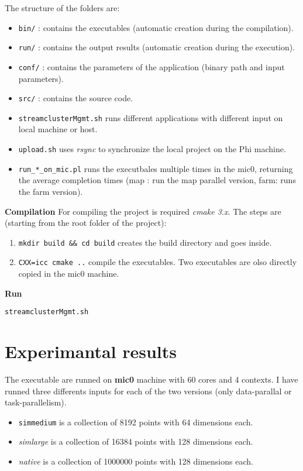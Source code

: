 \documentclass[12pt]{article}
\begin{document}
The structure of the folders are:
\begin{itemize}
\item \texttt{bin/}  : contains the executables (automatic creation during the compilation).
\item \texttt{run/}  : contains the output results (automatic creation during the execution).
\item \texttt{conf/} : contains the parameters of the application (binary path and input parameters).
\item \texttt{src/} : contains the source code.
\item \texttt{streamclusterMgmt.sh} runs different applications with different input on local machine or host.
\item \texttt{upload.sh} uses \textit{rsync} to synchronize the local project on the Phi machine.
\item \texttt{run\_*\_on\_mic.pl} runs the executbales multiple times in the mic0, returning the average completion times  (map : run the map parallel version, farm: runs the farm version).
\end{itemize}

\textbf{Compilation}
For compiling the project is required \textit{cmake 3.x}.
The steps are (starting from the root folder of the project):
\begin{enumerate}
\item \texttt{mkdir build \&\& cd build} creates the build directory and goes inside.
\item \texttt{CXX=icc cmake ..}  compile the executables. Two executables are olso directly copied in the mic0 machine.
\end{enumerate}

\textbf{Run} 
\begin{center}
\texttt{streamclusterMgmt.sh }
\end{center}


\section{Experimantal results}
The executable are runned on \textbf{mic0} machine with 60 cores and 4 contexts.
I have runned three differents inputs for each of the two versions (only data-parallal or task-parallelism).
\begin{itemize}
\item \texttt{simmedium} is a collection of 8192 points with 64 dimensions each.
\item \textit{simlarge} is a collection of 16384 points with 128 dimensions each.
\item \textit{native} is a collection of 1000000 points with 128 dimensions each.
\end{itemize}
\end{document}
